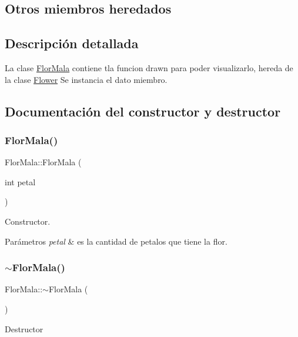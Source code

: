 \subsection*{Otros miembros heredados}


\subsection{Descripción detallada}
La clase \hyperlink{classFlorMala}{Flor\+Mala} contiene tla funcion drawn para poder visualizarlo, hereda de la clase \hyperlink{classFlower}{Flower}  Se instancia el dato miembro. 

\subsection{Documentación del constructor y destructor}
\mbox{\label{classFlorMala_ae429d216656c3c4ea50e71ee0740079f}} 
\subsubsection{\texorpdfstring{Flor\+Mala()}{FlorMala()}}
{\footnotesize\ttfamily Flor\+Mala\+::\+Flor\+Mala (\begin{DoxyParamCaption}\item[{int}]{petal }\end{DoxyParamCaption})}

Constructor. 
\begin{DoxyParams}{Parámetros}
{\em petal} & es la cantidad de petalos que tiene la flor. \\
\hline
\end{DoxyParams}
\mbox{\label{classFlorMala_ae85e1a4162127aad42b44d6609e5ce3f}} 
\subsubsection{\texorpdfstring{$\sim$\+Flor\+Mala()}{~FlorMala()}}
{\footnotesize\ttfamily Flor\+Mala\+::$\sim$\+Flor\+Mala (\begin{DoxyParamCaption}{ }\end{DoxyParamCaption})}

Destructor 

